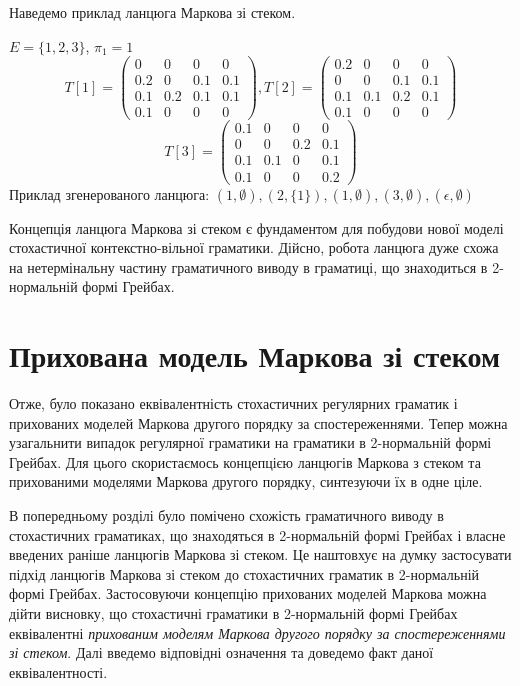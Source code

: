 Наведемо приклад ланцюга Маркова зі стеком.
\begin{example}
  $E = \{ 1, 2, 3 \}$, $\pi_1 = 1$
  $$ T[1] = \begin{pmatrix}
    0 & 0 & 0 & 0 \\
    0.2 & 0 & 0.1 & 0.1 \\
    0.1 & 0.2 & 0.1 & 0.1 \\
    0.1 & 0 & 0 & 0
  \end{pmatrix},
  T[2] = \begin{pmatrix}
    0.2 & 0 & 0 & 0 \\
    0 & 0 & 0.1 & 0.1 \\
    0.1 & 0.1 & 0.2 & 0.1 \\
    0.1 & 0 & 0 & 0
  \end{pmatrix}
  $$
  $$
  T[3] = \begin{pmatrix}
    0.1 & 0 & 0 & 0 \\
    0 & 0 & 0.2 & 0.1 \\
    0.1 & 0.1 & 0 & 0.1 \\
    0.1 & 0 & 0 & 0.2
  \end{pmatrix}$$
  Приклад згенерованого ланцюга:
  $ (1, \emptyset), (2, \{ 1 \}), (1, \emptyset), (3, \emptyset), (\epsilon, \emptyset) $
\end{example}
Концепція ланцюга Маркова зі стеком є фундаментом для побудови нової моделі стохастичної контекстно-вільної граматики. Дійсно, робота ланцюга дуже схожа на нетермінальну частину граматичного виводу в граматиці, що знаходиться в 2-нормальній формі Грейбах.

\section{Прихована модель Маркова зі стеком}
Отже, було показано еквівалентність стохастичних регулярних граматик і прихованих моделей Маркова другого порядку за спостереженнями. Тепер можна узагальнити випадок регулярної граматики на граматики в 2-нормальній формі Грейбах. Для цього скористаємось концепцією ланцюгів Маркова з стеком та прихованими моделями Маркова другого порядку, синтезуючи їх в одне ціле.

В попередньому розділі було помічено схожість граматичного виводу в стохастичних граматиках, що знаходяться в 2-нормальній формі Грейбах і власне введених раніше ланцюгів Маркова зі стеком. Це наштовхує на думку застосувати підхід ланцюгів Маркова зі стеком до стохастичних граматик в 2-нормальній формі Грейбах. Застосовуючи концепцію прихованих моделей Маркова можна дійти висновку, що стохастичні граматики в 2-нормальній формі Грейбах еквівалентні \textit{прихованим моделям Маркова другого порядку за спостереженнями зі стеком}. Далі введемо відповідні означення та доведемо факт даної еквівалентності.

